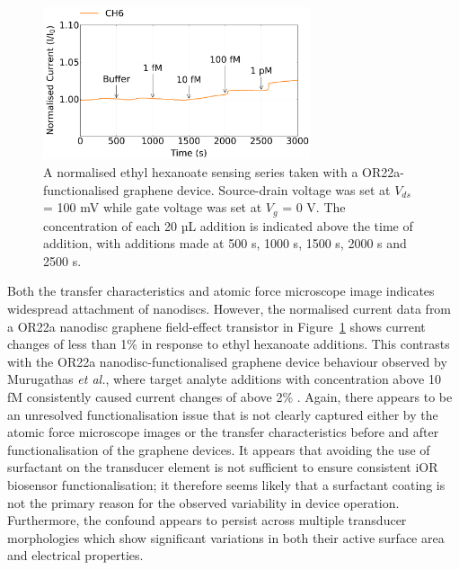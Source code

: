 \documentclass[
  a4paper,
]{scrbook}
\begin{document}
\begin{figure}

{\centering \includegraphics[width=0.7\textwidth,height=\textheight]{figures/ch7/Q3C3_filtered_detrend_trunc_arrows_normalised_edit.png}

}

\caption[A normalised ethyl hexanoate sensing series taken with a
OR22a-functionalised graphene device.]{\label{fig-graphene-sensing}A
normalised ethyl hexanoate sensing series taken with a
OR22a-functionalised graphene device. Source-drain voltage was set at
\(V_{ds}\) = 100 mV while gate voltage was set at \(V_g\) = 0 V. The
concentration of each 20 µL addition is indicated above the time of
addition, with additions made at 500 s, 1000 s, 1500 s, 2000 s and 2500
s.}

\end{figure}

Both the transfer characteristics and atomic force microscope image
indicates widespread attachment of nanodiscs. However, the normalised
current data from a OR22a nanodisc graphene field-effect transistor in
Figure~\ref{fig-graphene-sensing} shows current changes of less than 1\%
in response to ethyl hexanoate additions. This contrasts with the OR22a
nanodisc-functionalised graphene device behaviour observed by Murugathas
\emph{et al.}, where target analyte additions with concentration above
10 fM consistently caused current changes of above 2\%
\autocite{Murugathas2020}. Again, there appears to be an unresolved
functionalisation issue that is not clearly captured either by the
atomic force microscope images or the transfer characteristics before
and after functionalisation of the graphene devices. It appears that
avoiding the use of surfactant on the transducer element is not
sufficient to ensure consistent iOR biosensor functionalisation; it
therefore seems likely that a surfactant coating is not the primary
reason for the observed variability in device operation. Furthermore,
the confound appears to persist across multiple transducer morphologies
which show significant variations in both their active surface area and
electrical properties.
\end{document}
